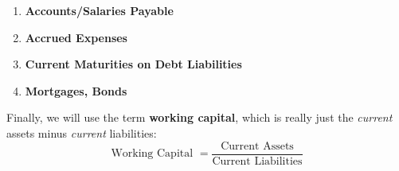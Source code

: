 \documentclass{article}
\begin{document}
    \begin{definition}[Liabilities]
      \label{def:liabilities-2}
      \begin{enumerate}
        \item \textbf{Accounts/Salaries Payable}
        \item \textbf{Accrued Expenses}
        \item \textbf{Current Maturities on Debt Liabilities}
        \item \textbf{Mortgages, Bonds}
      \end{enumerate}
    \end{definition}

    \begin{definition}
      \label{def:working-capital}
      Finally, we will use the term \textbf{working capital}, which is really just the \textit{current} assets minus \textit{current} liabilities:
      \begin{equation}
        \text{Working Capital } = \frac{\text{Current Assets}}{\text{Current Liabilities}}
      \end{equation}
    \end{definition}
\end{document}
